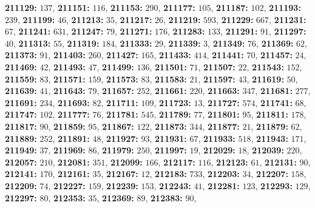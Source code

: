 \textsf{\bfseries 211129:} $137$, \textsf{\bfseries 211151:} $116$, \textsf{\bfseries 211153:} $290$, \textsf{\bfseries 211177:} $105$, \textsf{\bfseries 211187:} $102$, \textsf{\bfseries 211193:} $239$, \textsf{\bfseries 211199:} $46$, \textsf{\bfseries 211213:} $35$, \textsf{\bfseries 211217:} $26$, \textsf{\bfseries 211219:} $593$, \textsf{\bfseries 211229:} $667$, \textsf{\bfseries 211231:} $67$, \textsf{\bfseries 211241:} $631$, \textsf{\bfseries 211247:} $79$, \textsf{\bfseries 211271:} $176$, \textsf{\bfseries 211283:} $133$, \textsf{\bfseries 211291:} $91$, \textsf{\bfseries 211297:} $40$, \textsf{\bfseries 211313:} $55$, \textsf{\bfseries 211319:} $184$, \textsf{\bfseries 211333:} $29$, \textsf{\bfseries 211339:} $3$, \textsf{\bfseries 211349:} $76$, \textsf{\bfseries 211369:} $62$, \textsf{\bfseries 211373:} $91$, \textsf{\bfseries 211403:} $260$, \textsf{\bfseries 211427:} $165$, \textsf{\bfseries 211433:} $414$, \textsf{\bfseries 211441:} $70$, \textsf{\bfseries 211457:} $24$, \textsf{\bfseries 211469:} $42$, \textsf{\bfseries 211493:} $47$, \textsf{\bfseries 211499:} $136$, \textsf{\bfseries 211501:} $71$, \textsf{\bfseries 211507:} $22$, \textsf{\bfseries 211543:} $152$, \textsf{\bfseries 211559:} $83$, \textsf{\bfseries 211571:} $159$, \textsf{\bfseries 211573:} $83$, \textsf{\bfseries 211583:} $21$, \textsf{\bfseries 211597:} $43$, \textsf{\bfseries 211619:} $50$, \textsf{\bfseries 211639:} $41$, \textsf{\bfseries 211643:} $79$, \textsf{\bfseries 211657:} $252$, \textsf{\bfseries 211661:} $220$, \textsf{\bfseries 211663:} $347$, \textsf{\bfseries 211681:} $277$, \textsf{\bfseries 211691:} $234$, \textsf{\bfseries 211693:} $82$, \textsf{\bfseries 211711:} $109$, \textsf{\bfseries 211723:} $13$, \textsf{\bfseries 211727:} $574$, \textsf{\bfseries 211741:} $68$, \textsf{\bfseries 211747:} $102$, \textsf{\bfseries 211777:} $76$, \textsf{\bfseries 211781:} $545$, \textsf{\bfseries 211789:} $77$, \textsf{\bfseries 211801:} $95$, \textsf{\bfseries 211811:} $178$, \textsf{\bfseries 211817:} $90$, \textsf{\bfseries 211859:} $95$, \textsf{\bfseries 211867:} $122$, \textsf{\bfseries 211873:} $344$, \textsf{\bfseries 211877:} $21$, \textsf{\bfseries 211879:} $62$, \textsf{\bfseries 211889:} $252$, \textsf{\bfseries 211891:} $48$, \textsf{\bfseries 211927:} $93$, \textsf{\bfseries 211931:} $67$, \textsf{\bfseries 211933:} $518$, \textsf{\bfseries 211943:} $171$, \textsf{\bfseries 211949:} $37$, \textsf{\bfseries 211969:} $86$, \textsf{\bfseries 211979:} $250$, \textsf{\bfseries 211997:} $19$, \textsf{\bfseries 212029:} $18$, \textsf{\bfseries 212039:} $220$, \textsf{\bfseries 212057:} $210$, \textsf{\bfseries 212081:} $351$, \textsf{\bfseries 212099:} $166$, \textsf{\bfseries 212117:} $116$, \textsf{\bfseries 212123:} $61$, \textsf{\bfseries 212131:} $90$, \textsf{\bfseries 212141:} $170$, \textsf{\bfseries 212161:} $35$, \textsf{\bfseries 212167:} $12$, \textsf{\bfseries 212183:} $733$, \textsf{\bfseries 212203:} $34$, \textsf{\bfseries 212207:} $158$, \textsf{\bfseries 212209:} $74$, \textsf{\bfseries 212227:} $159$, \textsf{\bfseries 212239:} $153$, \textsf{\bfseries 212243:} $41$, \textsf{\bfseries 212281:} $123$, \textsf{\bfseries 212293:} $129$, \textsf{\bfseries 212297:} $80$, \textsf{\bfseries 212353:} $35$, \textsf{\bfseries 212369:} $89$, \textsf{\bfseries 212383:} $90$, 
